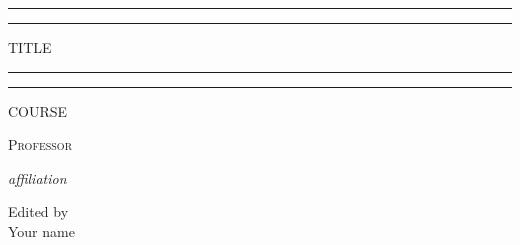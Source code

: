 \documentclass{package/notes}
\begin{document}
	\begin{titlepage} %
		
		\centering %
		
		\scshape %
		
		\vspace*{\baselineskip} %
		
		
		\rule{\textwidth}{1.6pt}\vspace*{-\baselineskip}\vspace*{2pt} %
		\rule{\textwidth}{0.4pt} %
		
		\vspace{0.75\baselineskip} %
		
		{\huge TITLE\\} %
		
		\vspace{0.75\baselineskip} %
		
		\rule{\textwidth}{0.4pt}\vspace*{-\baselineskip}\vspace{3.2pt} %
		\rule{\textwidth}{1.6pt} %
		
		\vspace{2\baselineskip} %
		
		
		\LARGE{COURSE} 
		
		\vspace*{3\baselineskip} %
		
		
		
		\vspace{0.5\baselineskip} 
		
		{\scshape   \LARGE Professor\\ } %
		
		\vspace{0.5\baselineskip} 
		
		\textit{\Large affiliation} %
		
		\vfill 
		
		
		
		\vspace{0.3\baselineskip} 
		
		
		{\large Edited by\\  Your name} 
		
	\end{titlepage}
	\tableofcontents
\end{document}
